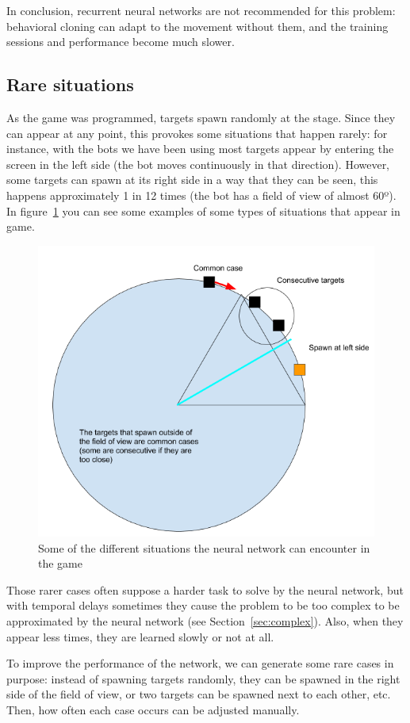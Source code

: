 In conclusion, recurrent neural networks are not recommended for this problem: behavioral cloning can adapt to the movement without them, and the training sessions and performance become much slower.

\subsection{Rare situations} %
\label{sec:spawner}

As the game was programmed, targets spawn randomly at the stage. Since they can appear at any point, this provokes some situations that happen rarely: for instance, with the bots we have been using most targets appear by entering the screen in the left side (the bot moves continuously in that direction). However, some targets can spawn at its right side in a way that they can be seen, this happens approximately 1 in 12 times (the bot has a field of view of almost 60º). In figure~\ref{fig:spawncases} you can see some examples of some types of situations that appear in game.

\begin{figure}[h]
  \centering
		\includegraphics[width=.6\textwidth]{img/spawncases.png}
  \caption{Some of the different situations the neural network can encounter in the game}
  \label{fig:spawncases}
\end{figure}

Those rarer cases often suppose a harder task to solve by the neural network, but with temporal delays sometimes they cause the problem to be too complex to be approximated by the neural network (see Section~\ref{sec:complex}). Also, when they appear less times, they are learned slowly or not at all.

To improve the performance of the network, we can generate some rare cases in purpose: instead of spawning targets randomly, they can be spawned in the right side of the field of view, or two targets can be spawned next to each other, etc. Then, how often each case occurs can be adjusted manually.

